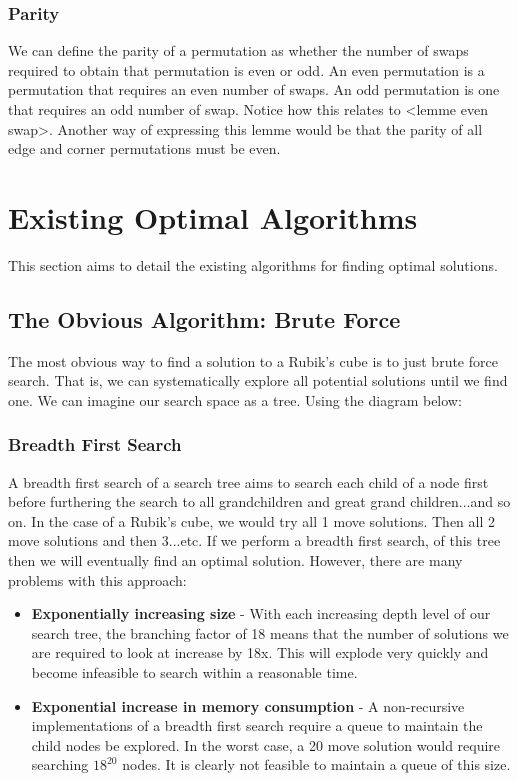 \documentclass[titlepage]{report}[12pt]
\begin{document}
\subsubsection{Parity} 
We can define the parity of a permutation as whether the number of swaps required to obtain that permutation is even or odd. An even permutation is a permutation that requires an even number of swaps. An odd permutation is one that requires an odd number of swap. Notice how this relates to <lemme even swap>. Another way of expressing this lemme would be that the parity of all edge and corner permutations must be even.

\clearpage
\section{Existing Optimal Algorithms}
This section aims to detail the existing algorithms for finding optimal solutions.  

\subsection{The Obvious Algorithm: Brute Force}
The most obvious way to find a solution to a Rubik's cube is to just brute force search. That is, we can systematically explore all potential solutions until we find one. We can imagine our search space as a tree. Using the diagram below:

\subsubsection{Breadth First Search}
A breadth first search of a search tree aims to search each child of a node first before furthering the search to all grandchildren and great grand children...and so on.
In the case of a Rubik's cube, we would try all 1 move solutions. Then all 2 move solutions and then 3...etc.
If we perform a breadth first search, of this tree then we will eventually find an optimal solution. However, there are many problems with this approach:
\begin{itemize}
\item \textbf{Exponentially increasing size} - With each increasing depth level of our search tree, the branching factor of 18 means that the number of solutions we are required to look at increase by 18x. This will explode very quickly and become infeasible to search within a reasonable time.

 \item \textbf{Exponential increase in memory consumption} - A non-recursive implementations of a breadth first search require a queue to maintain the child nodes be explored. In the worst case, a 20 move solution would require searching \begin{math}18^20\end{math} nodes. It is clearly not feasible to maintain a queue of this size.
\end{itemize}
\end{document}
